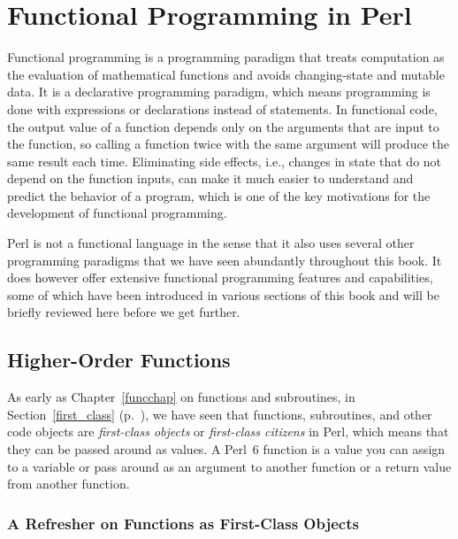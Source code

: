 \chapter{Functional Programming in Perl}
\label{functional programming}

Functional programming is a programming paradigm that treats 
computation as the evaluation of mathematical functions 
and avoids changing-state and mutable data. It is a 
declarative programming paradigm, which means programming 
is done with expressions or declarations instead of 
statements. In functional code, the output value of a function 
depends only on the arguments that are input to the function, 
so calling a function twice with the same argument will produce the 
same result each time. Eliminating side effects, i.e., changes 
in state that do not depend on the function inputs, can make 
it much easier to understand and predict the behavior of a 
program, which is one of the key motivations for the 
development of functional programming.

Perl is not a functional language in the sense that it  
also uses several other programming paradigms that we have seen 
abundantly throughout this book. It does however 
offer extensive functional programming features and 
capabilities, some of which have been introduced in 
various sections of this book and will be briefly 
reviewed here before we get further.

\section{Higher-Order Functions}

As early as Chapter~\ref{funcchap} on functions and 
subroutines, in Section~\ref{first_class} 
(p.~\pageref{first_class}), we have seen that functions,  
subroutines, and other code objects are \emph{first-class 
objects} or \emph{first-class citizens} in Perl, which 
means that they can be passed around as values. A Perl~6 
function is a value you can assign to a variable or pass 
around as an argument to another function or a return value from 
another function.

\subsection{A Refresher on Functions as First-Class Objects}
\label{fco-refresher}

